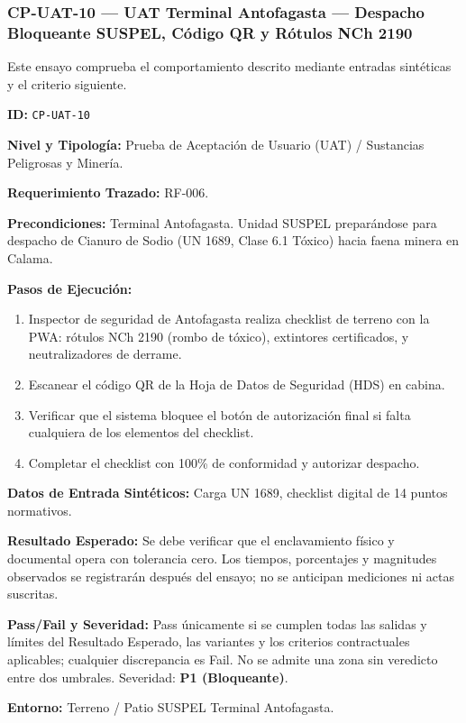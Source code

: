 \subsubsection*{CP-UAT-10 — UAT Terminal Antofagasta — Despacho Bloqueante SUSPEL, Código QR y Rótulos NCh 2190}\label{sec:9-cp-uat-10}
Este ensayo comprueba el comportamiento descrito mediante entradas sintéticas y el criterio siguiente.

\par\noindent\textbf{ID:} \texttt{C\allowbreak{}P\allowbreak{}-\allowbreak{}U\allowbreak{}A\allowbreak{}T\allowbreak{}-\allowbreak{}1\allowbreak{}0\allowbreak{}}\par
\par\noindent\textbf{Nivel y Tipología:} Prueba de Aceptación de Usuario (UAT) / Sustancias Peligrosas y Minería.\par
\par\noindent\textbf{Requerimiento Trazado:} RF-006.\par
\par\noindent\textbf{Precondiciones:} Terminal Antofagasta. Unidad SUSPEL preparándose para despacho de Cianuro de Sodio (UN 1689, Clase 6.1 Tóxico) hacia faena minera en Calama.\par
\par\noindent\textbf{Pasos de Ejecución:} \par
\begin{enumerate}
\item Inspector de seguridad de Antofagasta realiza checklist de terreno con la PWA: rótulos NCh 2190 (rombo de tóxico), extintores certificados, y neutralizadores de derrame.
\item Escanear el código QR de la Hoja de Datos de Seguridad (HDS) en cabina.
\item Verificar que el sistema bloquee el botón de autorización final si falta cualquiera de los elementos del checklist.
\item Completar el checklist con 100\% de conformidad y autorizar despacho.
\end{enumerate}
\par\noindent\textbf{Datos de Entrada Sintéticos:} Carga UN 1689, checklist digital de 14 puntos normativos.\par
\par\noindent\textbf{Resultado Esperado:} Se debe verificar que el enclavamiento físico y documental opera con tolerancia cero. Los tiempos, porcentajes y magnitudes observados se registrarán después del ensayo; no se anticipan mediciones ni actas suscritas.\par
\par\noindent\textbf{Pass/Fail y Severidad:} Pass únicamente si se cumplen todas las salidas y límites del Resultado Esperado, las variantes y los criterios contractuales aplicables; cualquier discrepancia es Fail. No se admite una zona sin veredicto entre dos umbrales. Severidad: \textbf{P1 (Bloqueante)}.\par
\par\noindent\textbf{Entorno:} Terreno / Patio SUSPEL Terminal Antofagasta.\par






